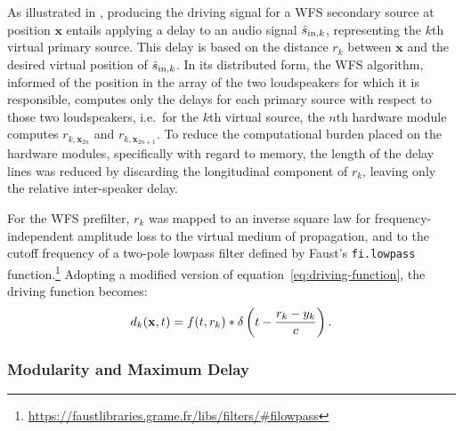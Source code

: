 As illustrated in , producing the driving signal for a WFS
secondary source at position $\mathbf{x}$ entails applying a delay to an audio
signal $\hat{s}_{\text{in},k}$, representing the $k$th virtual primary source.
This delay is based on the distance $r_k$ between $\mathbf{x}$ and the
desired virtual position of $\hat{s}_{\text{in},k}$.
In its distributed form, the WFS algorithm, informed of the position in the
array of the two loudspeakers for which it is responsible, computes only the
delays for each primary source with respect to those two loudspeakers, i.e.\
for the $k$th virtual source, the $n$th hardware module computes
$r_{k,\mathbf{x}_{2n}}$ and $r_{k,\mathbf{x}_{2n+1}}$.
To reduce the computational burden placed on the hardware modules, specifically
with regard to memory, the length of the delay lines was reduced by discarding
the longitudinal component of $r_k$, leaving only the relative inter-speaker
delay.

For the WFS prefilter, $r_k$ was mapped to an inverse square law for
frequency-independent amplitude loss to the virtual medium of propagation, and
to the cutoff frequency of a two-pole lowpass filter defined by Faust's
\texttt{fi.lowpass} function.\footnote{
    \url{https://faustlibraries.grame.fr/libs/filters/\#filowpass}
}
Adopting a modified version of equation~\eqref{eq:driving-function}, the
driving function becomes:
\begin{equation}
    \label{eq:simple-driving-function}
    d_k(\mathbf{x},t) = f(t, r_k) \ast \delta\left(t - \frac{r_k-y_k}{c}\right).
\end{equation}

\subsubsection{Modularity and Maximum Delay}

